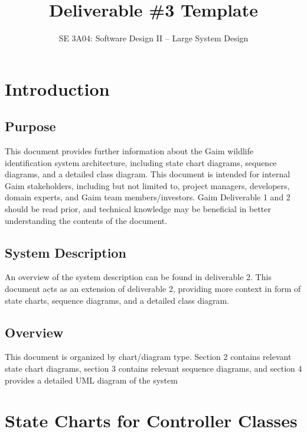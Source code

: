 \documentclass[]{article}
\title{Deliverable \#3 Template}
\author{SE 3A04: Software Design II -- Large System Design}
\date{}
\numberwithin{figure}{section}
\begin{document}
\maketitle	

\section{Introduction}
\label{sec:introduction}

\subsection{Purpose}
\label{sub:purpose}
This document provides further information about the Gaim wildlife identification system architecture, including
state chart diagrams, sequence diagrams, and a detailed class diagram.
This document is intended for internal Gaim stakeholders, including but not limited to, project managers,
developers, domain experts, and Gaim team members/investors. Gaim Deliverable 1 and 2 should be
read prior, and technical knowledge may be beneficial in better understanding the contents of the document.

\subsection{System Description}
\label{sub:system_description}
An overview of the system description can be found in deliverable 2. This document acts as an extension
of deliverable 2, providing more context in form of state charts, sequence diagrams, and a detailed class
diagram.

\subsection{Overview}
\label{sub:overview}
This document is organized by chart/diagram type. Section 2 contains relevant state chart diagrams, section
3 contains relevant sequence diagrams, and section 4 provides a detailed UML diagram of the system
\clearpage 


\section{State Charts for Controller Classes}
\label{sec:state_charts_for_controller_classes}
\end{document}
